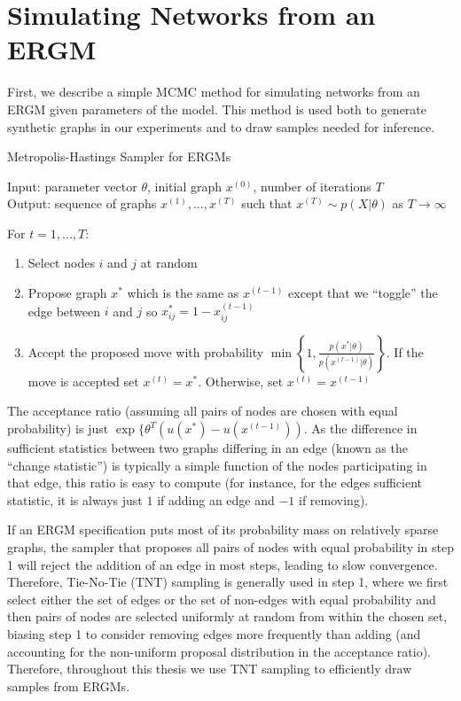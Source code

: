 \section{Simulating Networks from an ERGM}
\label{sec:sim_ergm}

First, we describe a simple MCMC method for simulating networks from an ERGM given parameters of the model. This method is used both to generate synthetic graphs in our experiments and to draw samples needed for inference.

\begin{algorithm}[!ht]
	\caption{Metropolis-Hastings Sampler for ERGMs}
	Input: parameter vector $\theta$, initial graph $x^{(0)}$, number of iterations $T$ \\
	Output: sequence of graphs $x^{(1)},...,x^{(T)}$ such that $x^{(T)} \sim p(X | \theta)$ as $T \to \infty$
	
	\vspace{0.1in}
	For {$ t = 1,...,T$}:
	\begin{enumerate}
		\item  Select nodes $i$ and $j$ at random
		\item Propose graph $x^*$ which is the same as $x^{(t-1)}$ except that we ``toggle'' the edge between $i$ and $j$ so $x^*_{ij} = 1 - x^{(t-1)}_{ij}$
		\item Accept the proposed move with probability $\min\left\{1, \frac{p(x^* | \theta)}{p(x^{(t-1)} | \theta)} \right\}$. If the move is accepted set $x^{(t)} = x^*$. Otherwise, set $x^{(t)} = x^{(t-1)}$
	\end{enumerate}
\end{algorithm}

The acceptance ratio (assuming all pairs of nodes are chosen with equal probability) is just $ \exp \{\theta^T(u(x^*) - u(x^{(t-1)}))$. As the difference in sufficient statistics between two graphs differing in an edge (known as the ``change statistic'') is typically a simple function of the nodes participating in that edge, this ratio is easy to compute (for instance, for the edges sufficient statistic, it is always just $1$ if adding an edge and $-1$ if removing). 

 If an ERGM specification puts most of its probability mass on relatively sparse graphs, the sampler that proposes all pairs of nodes with equal probability in step 1 will reject the addition of an edge in most steps, leading to slow convergence. Therefore, Tie-No-Tie (TNT) sampling is generally used in step 1, where we first select either the set of edges or the set of non-edges with equal probability and then pairs of nodes are selected uniformly at random from within the chosen set, biasing step 1 to consider removing edges more frequently than adding (and accounting for the non-uniform proposal distribution in the acceptance ratio). Therefore, throughout this thesis we use TNT sampling to efficiently draw samples from ERGMs. \cite{LKR12}

